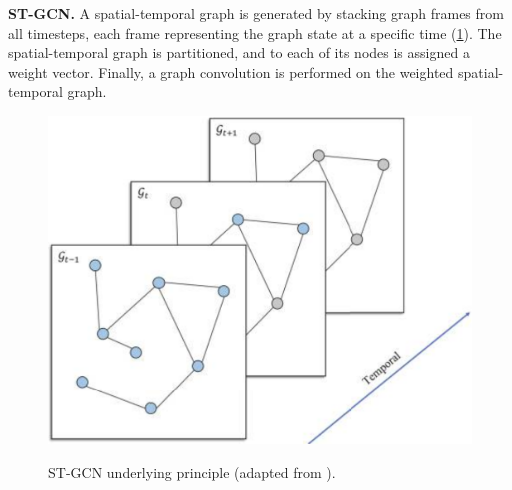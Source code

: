 \noindent
\textbf{ST-GCN.} A spatial-temporal graph is generated by stacking graph frames from all timesteps, each frame representing the graph state at a specific time (\ref{fig:stgcn}). The spatial-temporal graph is partitioned, and to each of its nodes is assigned a weight vector. Finally, a graph convolution is performed on the weighted spatial-temporal graph.
\begin{figure}[H]
	\centering
 	\caption{ST-GCN underlying principle (adapted from \cite{liu2019st-mgcn}).}
	\includegraphics[scale=0.25]{stgcn.png}
	\label{fig:stgcn}
\end{figure}

